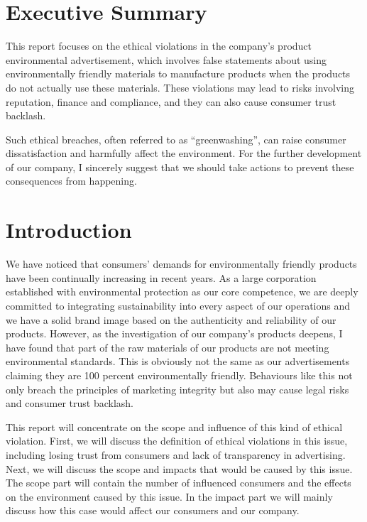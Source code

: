 \documentclass[12pt]{article}
\begin{document}
\tableofcontents
\clearpage
{}

\section{Executive Summary}

This report focuses on the ethical violations in the company's product environmental advertisement, which involves false statements about using environmentally friendly materials to manufacture products when the products do not actually use these materials. These violations may lead to risks involving reputation, finance and compliance, and they can also cause consumer trust backlash.

Such ethical breaches, often referred to as ``greenwashing'', can raise consumer dissatisfaction and harmfully affect the environment. For the further development of our company, I sincerely suggest that we should take actions to prevent these consequences from happening.

\clearpage

\section{Introduction}

We have noticed that consumers' demands for environmentally friendly products have been continually increasing in recent years. As a large corporation established with environmental protection as our core competence, we are deeply committed to integrating sustainability into every aspect of our operations and we have a solid brand image based on the authenticity and reliability of our products. However, as the investigation of our company's products deepens, I have found that part of the raw materials of our products are not meeting environmental standards. This is obviously not the same as our advertisements claiming they are 100 percent environmentally friendly. Behaviours like this not only breach the principles of marketing integrity but also may cause legal risks and consumer trust backlash.

This report will concentrate on the scope and influence of this kind of ethical violation. First, we will discuss the definition of ethical violations in this issue, including losing trust from consumers and lack of transparency in advertising. Next, we will discuss the scope and impacts that would be caused by this issue. The scope part will contain the number of influenced consumers and the effects on the environment caused by this issue. In the impact part we will mainly discuss how this case would affect our consumers and our company.
\end{document}
